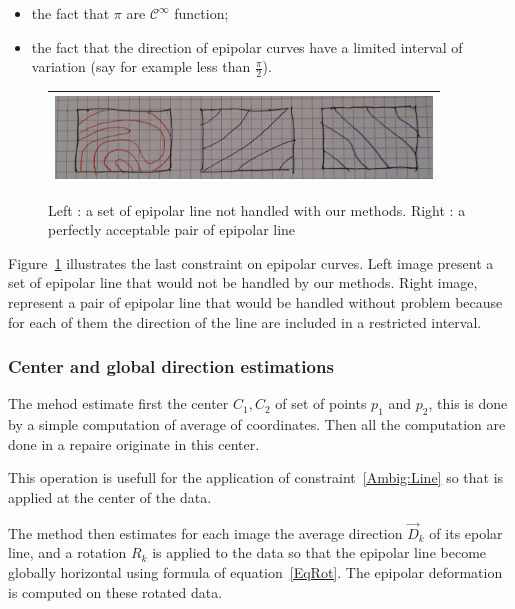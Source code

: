 \documentclass[a4paper]{article}
\begin{document}
\begin{itemize}
    \item the fact that $\pi$ are   $\mathcal{C}^{\infty}$ function;
    \item the fact that the direction of epipolar curves have a limited interval of variation (say for example
          less than $\frac{\pi}{2}$).
\end{itemize}

\begin{figure}
\centering
\begin{tabular}{||c||}
 \hline \hline
\includegraphics[width=10cm]{FIGS/BadGoodLines.jpg}
 \\ \hline \hline
\end{tabular}
\caption{Left : a set of epipolar line not handled with our methods. Right : a perfectly acceptable pair  of epipolar line}
\label{BadGoodEpip}
\end{figure}

Figure~\ref{BadGoodEpip} illustrates the last constraint on epipolar curves. Left image present a set
of epipolar line that would not be handled by our methods.  Right image, represent a pair of epipolar line
that would be handled without problem because for each of them the direction of the line are included
in a restricted interval. 


\subsubsection{Center and global direction estimations}

The mehod estimate first the center $C_1,C_2$ of set of points $p_1$ and $p_2$, this is done by
a simple computation of average of coordinates.  Then all the computation are done in
a repaire originate in this center. 

This operation is usefull for the  application of constraint~\ref{Ambig:Line} so that is applied
at the center of the data.



The method then estimates for each image the average direction $\vec{D}_k$
of its epolar line, and a rotation $R_k$ is applied to the data so that the epipolar line become
globally horizontal using formula of equation~\ref{EqRot}.
The  epipolar deformation is computed on these rotated data.
\end{document}
